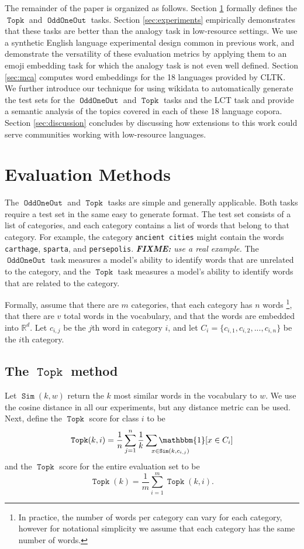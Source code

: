 \documentclass[11pt,a4paper]{article}
\newcommand{\indicator}[1]{\mathbbm{1}\!\left[{#1}\right]}
\newcommand{\R}{\mathbb R}
\DeclareMathOperator{\FindMostSimilar}{\texttt{Sim}}
\DeclareMathOperator{\OddOneOut}{\texttt{OddOneOut}}
\DeclareMathOperator{\topk}{\texttt{Topk}}
\newcommand{\fixme}[1]{{\color{red}\itshape \textbf{FIXME:} {#1}}}
\begin{document}
The remainder of the paper is organized as follows.
Section \ref{sec:method} formally defines the $\topk$ and $\OddOneOut$ tasks.
Section \ref{sec:experiments} empirically demonstrates that these tasks are better than the analogy task in low-resource settings.
We use a synthetic English language experimental design common in previous work,
and demonstrate the versatility of these evaluation metrics by applying them to an emoji embedding task for which the analogy task is not even well defined.
Section \ref{sec:mca} computes word embeddings for the 18 languages provided by CLTK.
We further introduce our technique for using wikidata to automatically generate the test sets for the $\OddOneOut$ and $\topk$ tasks and the LCT task and provide a semantic analysis of the topics covered in each of these 18 language copora.
Section \ref{sec:discussion} concludes by discussing how extensions to this work could serve communities working with low-resource languages.

\section{Evaluation Methods}
\label{sec:method}
The $\OddOneOut$ and $\topk$ tasks are simple and generally applicable.
Both tasks require a test set in the same easy to generate format.
The test set consists of a list of categories,
and each category contains a list of words that belong to that category.
For example, the category \texttt{ancient cities} might contain the words \texttt{carthage}, \texttt{sparta}, and \texttt{persepolis}. \fixme{use a real example.}
The $\OddOneOut$ task measures a model's ability to identify words that are unrelated to the category,
and the $\topk$ task measures a model's ability to identify words that are related to the category.

Formally,
assume that there are $m$ categories,
that each category has $n$ words%
\footnote{
    In practice, the number of words per category can vary for each category,
    however for notational simplicity we assume that each category has the same number of words.
},
that there are $v$ total words in the vocabulary,
and that the words are embedded into $\R^d$.
Let $c_{i,j}$ be the $j$th word in category $i$,
and let $C_i = \{c_{i,1}, c_{i,2}, ..., c_{i,n}\}$ be the $i$th category.

\subsection{The $\topk$ method}
Let $\FindMostSimilar(k,w)$ return the $k$ most similar words in the vocabulary to $w$.
We use the cosine distance in all our experiments,
but any distance metric can be used.
Next, define the $\topk$ score for class $i$ to be
\begin{equation}
    \topk(k,i) = \frac{1}{n}\sum_{j=1}^n \frac{1}{k}\sum_{\mathrlap{x \in \FindMostSimilar(k, c_{i,j})}} \indicator{x \in C_i}
\end{equation}
and the $\topk$ score for the entire evaluation set to be
\begin{equation}
    \topk(k) = \frac{1}{m}\sum_{i=1}^m \topk(k,i)
    .
\end{equation}
\end{document}
